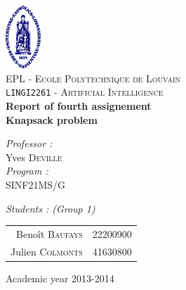 \begin{titlepage}
 
\begin{center}
 
\vspace*{-2cm}\includegraphics[width=0.10\textwidth]{ucl.png}\\[1cm]
 
\textsc{\LARGE EPL - Ecole Polytechnique de Louvain}\\[1.5cm]
 
\textsc{\Large \texttt{LINGI2261} - Artificial Intelligence}\\[0.5cm]
 
 
\vspace{1.0cm}
{ \huge \bfseries Report of fourth assignement\\Knapsack problem\vspace{0.8cm}\\}
 
\vspace{1.0cm}
 
\begin{minipage}{0.4\textwidth}
\begin{flushleft} \large
\emph{Professor :}\\
	Yves \textsc{Deville}\\
\vspace{1cm}
\emph{Program :}\\
	SINF21MS/G
\end{flushleft}
\end{minipage}
\begin{minipage}{0.4\textwidth}
\begin{flushright} \large
\emph{Students : (Group 1)} \\
\begin{tabular}{rl}
	Benoît \textsc{Baufays}		& {\footnotesize 22200900}\\
	Julien \textsc{Colmonts}	& {\footnotesize 41630800}\\
\end{tabular}
\end{flushright}
\end{minipage}
 
\vfill
 
\vspace{1.1cm}
{\large Academic year 2013-2014}
\vspace{-1cm} 
\end{center}
 
\end{titlepage}
